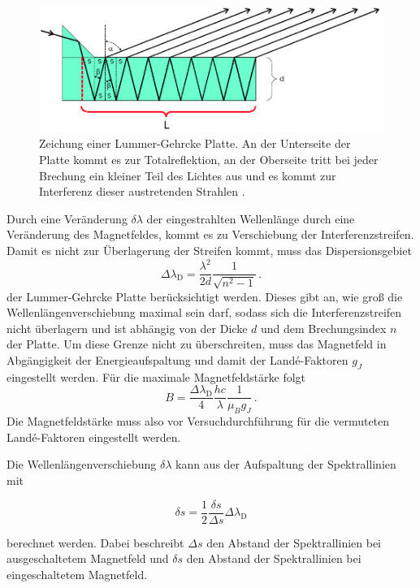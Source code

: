 \begin{figure}
  \centering
  \includegraphics[width=.5\textwidth]{images/Lummer.png}
  \caption{Zeichung einer Lummer-Gehrcke Platte. An der Unterseite der Platte kommt es zur Totalreflektion, an der Oberseite tritt bei jeder Brechung ein kleiner Teil des Lichtes aus und es kommt zur Interferenz dieser austretenden Strahlen \cite{anleitung}.}
  \label{fig:Lummer-Gehrcke}
\end{figure}

Durch eine Veränderung $\delta \lambda$ der eingestrahlten Wellenlänge durch eine Veränderung des Magnetfeldes, kommt es zu Verschiebung der Interferenzstreifen.
Damit es nicht zur Überlagerung der Streifen kommt, muss das Dispersionsgebiet
\begin{equation*}
  \Delta \lambda_\text{D} = \frac{\lambda^2}{2d} \frac{1}{\sqrt{n^2-1}} \, .
\end{equation*}
der Lummer-Gehrcke Platte berücksichtigt werden.
Dieses gibt an, wie groß die Wellenlängenverschiebung maximal sein darf, sodass sich die Interferenzstreifen nicht überlagern und ist abhängig von der Dicke $d$ und dem Brechungsindex $n$ der Platte.
Um diese Grenze nicht zu überschreiten, muss das Magnetfeld in Abgängigkeit der Energieaufspaltung und damit der Landé-Faktoren $g_J$ eingestellt werden.
Für die maximale Magnetfeldstärke folgt
\begin{equation} \label{eqn:B}
  B = \frac{\Delta \lambda_\text{D}}{4} \frac{h c}{\lambda} \frac{1}{\mu_B g_J} \,.
\end{equation}
Die Magnetfeldstärke muss also vor Versuchdurchführung für die vermuteten Landé-Faktoren eingestellt werden.

\par\medskip

Die Wellenlängenverschiebung $\delta \lambda$ kann aus der Aufspaltung der Spektrallinien mit

\begin{equation}\label{eqn:WV}
  \delta s = \frac{1}{2} \frac{\delta s}{\Delta s} \Delta \lambda_\text{D}
\end{equation}

berechnet werden.
Dabei beschreibt $\Delta s$ den Abstand der Spektrallinien bei ausgeschaltetem Magnetfeld und $\delta s$ den Abstand der Spektrallinien bei eingeschaltetem Magnetfeld.
